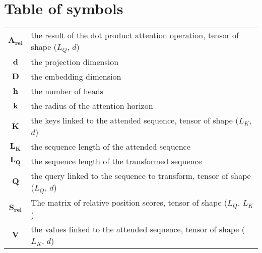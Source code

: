 \section*{Table of symbols}

\begin{tabular}{cp{}}
	$\boldsymbol{A_{rel}}$ & the result of the dot product attention operation, tensor of shape ($L_Q$, $d$)\\
	$\boldsymbol{d}$ & the projection dimension\\
	$\boldsymbol{D}$ & the embedding dimension\\
	$\boldsymbol{h}$ & the number of heads\\
	$\boldsymbol{k}$ & the radius of the attention horizon\\
	$\boldsymbol{K}$ & the keys linked to the attended sequence, tensor of shape ($L_K$, $d$)\\
	$\boldsymbol{L_K}$ & the sequence length of the attended sequence\\
	$\boldsymbol{L_Q}$ & the sequence length of the transformed sequence\\
	$\boldsymbol{Q}$ & the query linked to the sequence to transform, tensor of shape ($L_Q$, $d$)\\
	$\boldsymbol{S_{rel}}$ & The matrix of relative position scores, tensor of shape ($L_Q$, $L_K$)\\
	$\boldsymbol{V}$ & the values linked to the attended sequence, tensor of shape ($L_K$, $d$)\\
\end{tabular}

\endinput